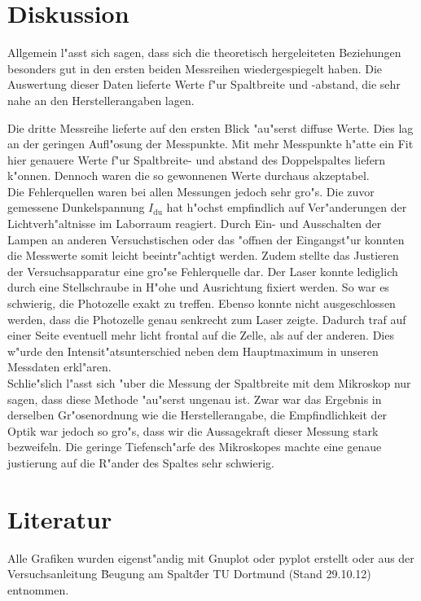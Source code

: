 \section{Diskussion}
	\label{sec:diskussion}

	Allgemein l"asst sich sagen, dass sich die theoretisch hergeleiteten Beziehungen besonders gut in den ersten beiden Messreihen wiedergespiegelt haben.
	Die Auswertung dieser Daten lieferte Werte f"ur Spaltbreite und -abstand, die sehr nahe an den Herstellerangaben lagen.

	Die dritte Messreihe lieferte auf den ersten Blick "au"serst diffuse Werte. Dies lag an der geringen Aufl"osung der Messpunkte.
	Mit mehr Messpunkte h"atte ein Fit hier genauere Werte f"ur Spaltbreite- und abstand des Doppelspaltes liefern k"onnen. Dennoch waren die so gewonnenen Werte durchaus akzeptabel.\\

	Die Fehlerquellen waren bei allen Messungen jedoch sehr gro"s.
	Die zuvor gemessene Dunkelspannung $I_\mathrm{du}$ hat h"ochst empfindlich auf Ver"anderungen der Lichtverh"altnisse im Laborraum reagiert.
	Durch Ein- und Ausschalten der Lampen an anderen Versuchstischen oder das "offnen der Eingangst"ur konnten die Messwerte somit leicht beeintr"achtigt werden.
	Zudem stellte das Justieren der Versuchsapparatur eine gro"se Fehlerquelle dar.
	Der Laser konnte lediglich durch eine Stellschraube in H"ohe und Ausrichtung fixiert werden.
	So war es schwierig, die Photozelle exakt zu treffen.
	Ebenso konnte nicht ausgeschlossen werden, dass die Photozelle genau senkrecht zum Laser zeigte.
	Dadurch traf auf einer Seite eventuell mehr licht frontal auf die Zelle, als auf der anderen.
	Dies w"urde den Intensit"atsunterschied neben dem Hauptmaximum in unseren Messdaten erkl"aren.\\
	
	Schlie"slich l"asst sich "uber die Messung der Spaltbreite mit dem Mikroskop nur sagen, dass diese Methode "au"serst ungenau ist.
	Zwar war das Ergebnis in derselben Gr"osenordnung wie die Herstellerangabe, die Empfindlichkeit der Optik war jedoch so gro"s, dass wir die Aussagekraft dieser Messung stark bezweifeln.
	Die geringe Tiefensch"arfe des Mikroskopes machte eine genaue justierung auf die R"ander des Spaltes sehr schwierig.

\section{Literatur}

	Alle Grafiken wurden eigenst"andig mit Gnuplot oder pyplot erstellt oder aus der Versuchsanleitung \"Beugung am Spalt\" der TU Dortmund (Stand 29.10.12) entnommen.